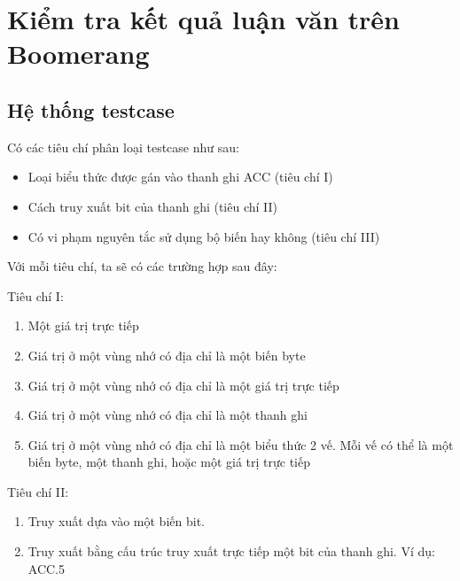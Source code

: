 \section{Kiểm tra kết quả luận văn trên Boomerang}

\subsection{Hệ thống testcase}
Có các tiêu chí phân loại testcase như sau:
\begin{itemize}
	\item Loại biểu thức được gán vào thanh ghi ACC (tiêu chí I)
	\item Cách truy xuất bit của thanh ghi (tiêu chí II)
	\item Có vi phạm nguyên tắc sử dụng bộ biến hay không (tiêu chí III)
\end{itemize}
Với mỗi tiêu chí, ta sẽ có các trường hợp sau đây:

Tiêu chí I:
\begin{enumerate}
	\item Một giá trị trực tiếp
	\item Giá trị ở một vùng nhớ có địa chỉ là một biến byte
	\item Giá trị ở một vùng nhớ có địa chỉ là một giá trị trực tiếp
	\item Giá trị ở một vùng nhớ có địa chỉ là một thanh ghi
	\item Giá trị ở một vùng nhớ có địa chỉ là một biểu thức 2 vế. Mỗi vế có thể là một biến byte, một thanh ghi, hoặc một giá trị trực tiếp
\end{enumerate}

Tiêu chí II:
\begin{enumerate}
	\item Truy xuất dựa vào một biến bit.
	\item Truy xuất bằng cấu trúc truy xuất trực tiếp một bit của thanh ghi. Ví dụ: ACC.5
\end{enumerate}

